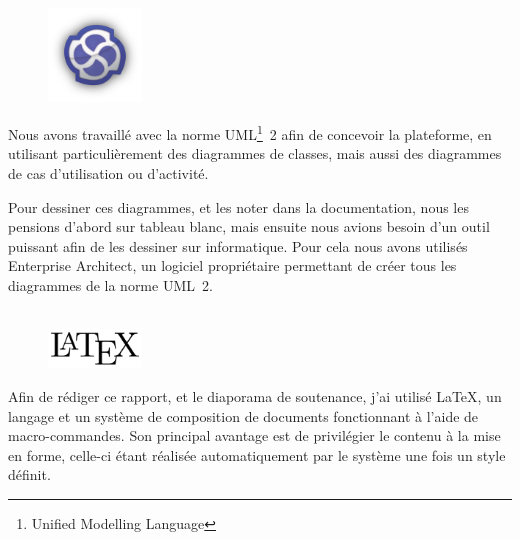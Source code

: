 \begin{figure}
	\includegraphics[width=2.5cm]{contents/images/logoEnterpriseArchitect.png}
\end{figure}
Nous avons travaillé avec la norme UML\footnote{Unified Modelling Language}~2 afin de concevoir la plateforme, en utilisant particulièrement des diagrammes de classes, mais aussi des diagrammes de cas d'utilisation ou d'activité. 

Pour dessiner ces diagrammes, et les noter dans la documentation, nous les pensions d'abord sur tableau blanc, mais ensuite nous avions besoin d'un outil puissant afin de les dessiner sur informatique. Pour cela nous avons utilisés Enterprise Architect, un logiciel propriétaire permettant de créer tous les diagrammes de la norme UML~2.\\~

\begin{figure}
	\includegraphics[width=2.5cm]{contents/images/logoLatex.png}
\end{figure}
Afin de rédiger ce rapport, et le diaporama de soutenance, j'ai utilisé \LaTeX{}, un langage et un système de composition de documents fonctionnant à l'aide de
macro-commandes. Son principal avantage est de privilégier le contenu à la mise en forme, celle-ci étant réalisée automatiquement par le système une fois un style définit. 

